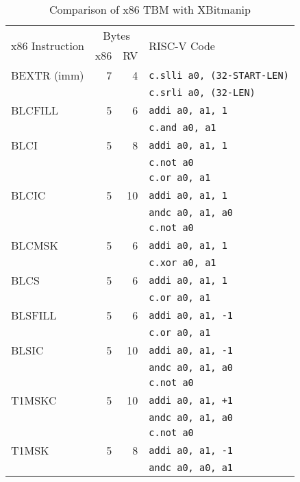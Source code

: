 \begin{table}[h]
\centering
\begin{tabular}{lrrl}
\multirow{2}{*}{x86 Instruction} & \multicolumn{2}{c}{Bytes} & \multirow{2}{*}{RISC-V Code} \\
& x86 & RV & \\
\hline
BEXTR (imm)  & 7 &  4 & {\tt c.slli a0, (32-START-LEN)} \\
             &   &    & {\tt c.srli a0, (32-LEN)} \\
\hline
BLCFILL      & 5 &  6 & {\tt addi a0, a1, 1} \\
             &   &    & {\tt c.and a0, a1} \\
\hline
BLCI         & 5 &  8 & {\tt addi a0, a1, 1} \\
             &   &    & {\tt c.not a0} \\
             &   &    & {\tt c.or a0, a1} \\
\hline
BLCIC        & 5 & 10 & {\tt addi a0, a1, 1} \\
             &   &    & {\tt andc a0, a1, a0} \\
             &   &    & {\tt c.not a0} \\
\hline
BLCMSK       & 5 &  6 & {\tt addi a0, a1, 1} \\
             &   &    & {\tt c.xor a0, a1} \\
\hline
BLCS         & 5 &  6 & {\tt addi a0, a1, 1} \\
             &   &    & {\tt c.or a0, a1} \\
\hline
BLSFILL      & 5 &  6 & {\tt addi a0, a1, -1} \\
             &   &    & {\tt c.or a0, a1} \\
\hline
BLSIC        & 5 & 10 & {\tt addi a0, a1, -1} \\
             &   &    & {\tt andc a0, a1, a0} \\
             &   &    & {\tt c.not a0} \\
\hline
T1MSKC       & 5 & 10 & {\tt addi a0, a1, +1} \\
             &   &    & {\tt andc a0, a1, a0} \\
             &   &    & {\tt c.not a0} \\
\hline
T1MSK        & 5 &  8 & {\tt addi a0, a1, -1} \\
             &   &    & {\tt andc a0, a0, a1} \\
\end{tabular}
\caption{Comparison of x86 TBM with XBitmanip}
\label{tbm-comp}
\end{table}

